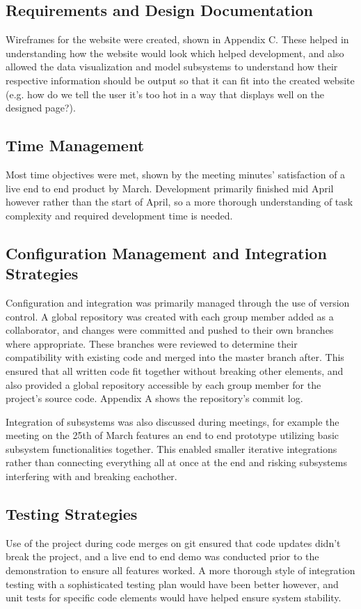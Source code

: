 \documentclass[]{report}
\begin{document}
	\subsection{Requirements and Design Documentation}
	Wireframes for the website were created, shown in Appendix C. These helped in understanding how the website would look which helped development, and also allowed the data visualization and model subsystems to understand how their respective information should be output so that it can fit into the created website (e.g. how do we tell the user it's too hot in a way that displays well on the designed page?).
	
	\subsection{Time Management}
	Most time objectives were met, shown by the meeting minutes' satisfaction of a live end to end product by March. Development primarily finished mid April however rather than the start of April, so a more thorough understanding of task complexity and required development time is needed.
	
	\subsection{Configuration Management and Integration Strategies}
	Configuration and integration was primarily managed through the use of version control. A global repository was created with each group member added as a collaborator, and changes were committed and pushed to their own branches where appropriate. These branches were reviewed to determine their compatibility with existing code and merged into the master branch after. This ensured that all written code fit together without breaking other elements, and also provided a global repository accessible by each group member for the project's source code. Appendix A shows the repository's commit log. 
	
	Integration of subsystems was also discussed during meetings, for example the meeting on the 25th of March features an end to end prototype utilizing basic subsystem functionalities together. This enabled smaller iterative integrations rather than connecting everything all at once at the end and risking subsystems interfering with and breaking eachother.
	
	\subsection{Testing Strategies}
	Use of the project during code merges on git ensured that code updates didn't break the project, and a live end to end demo was conducted prior to the demonstration to ensure all features worked. A more thorough style of integration testing with a sophisticated testing plan would have been better however, and unit tests for specific code elements would have helped ensure system stability.
	
\end{document}

